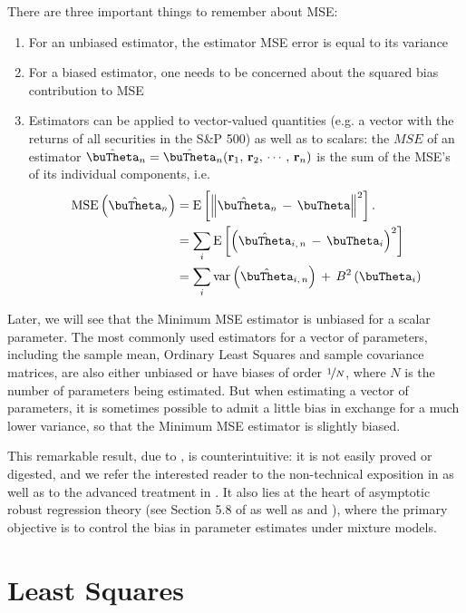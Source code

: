 \documentclass[graybox,envcountchap,sectrefs]{svmono}\usepackage[]{graphicx}\usepackage[]{xcolor}
\begin{document}
\begin{appendices}
There are three important things to remember about MSE:
\begin{enumerate}
\item For an unbiased estimator, the estimator MSE error is equal to its
variance
\item For a biased estimator, one needs to be concerned about the squared
bias contribution to MSE
\item Estimators can be applied to vector-valued quantities (e.g. a vector
with the returns of all securities in the S\&P 500) as well as to
scalars: the $MSE$ of an estimator $\hat{\buTheta}_{n}=\hat{\buTheta}_{n}(\mathbf{r}_{1},\,\mathbf{r}_{2},\,\cdots\,,\,\mathbf{r}_{n})$
is the sum of the MSE's of its individual components, i.e.
\begin{align}
\mathrm{MSE}\left(\hat{\buTheta}_{n}\right) & =\mathrm{E}\left[\left\Vert \hat{\buTheta}_{n}\,-\,\buTheta\right\Vert ^{2}\right].\nonumber \\
 & =\sum_{i}\mathrm{E}\left[\left(\hat{\buTheta}_{i,\,n}\,-\,\buTheta_{i}\right)^{2}\right]\nonumber \\
 & =\sum_{i}\mathrm{var}\left(\hat{\buTheta}_{i,\,n}\right)\,+\,B^{2}\left(\buTheta_{i}\right)\label{eq:MSEvector}
\end{align}
\end{enumerate}
Later, we will see that the Minimum MSE estimator is unbiased for
a scalar parameter. The most commonly used estimators for a vector
of parameters, including the sample mean, Ordinary Least Squares and
sample covariance matrices, are also either unbiased or have biases
of order $\nicefrac{1}{N}$, where $N$ is the number of parameters
being estimated. But when estimating a vector of parameters, it is
sometimes possible to admit a little bias in exchange for a much lower
variance, so that the Minimum MSE estimator is slightly biased. 

This remarkable result, due to \citet{Stein1956}, is counterintuitive:
it is not easily proved or digested, and we refer the interested reader
to the non-technical exposition in \citet{EfronMorris1977} as well
as to the advanced treatment in \citet{TsukumaKubokawa2020}. It also
lies at the heart of asymptotic robust regression theory (see Section
5.8 of \citet{Maronna2019} as well as \citet{YohaiZamar1997} and
\citet{Svarc2002}), where the primary objective is to control the
bias in parameter estimates under mixture models. 

\section{Least Squares\label{sec:LeastSquares}}


\end{appendices}
\end{document}
